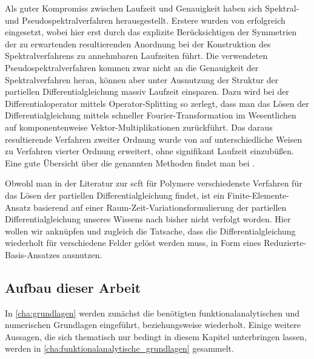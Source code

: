 Als guter Kompromiss zwischen Laufzeit und Genauigkeit haben sich Spektral- und Pseudospektralverfahren herausgestellt.
Erstere wurden von \textcite{Matsen:1994bz} erfolgreich eingesetzt, wobei hier erst durch das explizite Berücksichtigen der Symmetrien der zu erwartenden resultierenden Anordnung bei der Konstruktion des Spektralverfahrens zu annehmbaren Laufzeiten führt.
Die verwendeten Pseudospektralverfahren kommen zwar nicht an die Genauigkeit der Spektralverfahren heran, können aber unter Ausnutzung der Struktur der partiellen Differentialgleichung massiv Laufzeit einsparen.
Dazu wird bei \textcite{Rasmussen:2002kt} der Differentialoperator mittels Operator-Splitting so zerlegt, dass man das Lösen der Differentialgleichung mittels schneller Fourier-Transformation im Wesentlichen auf komponentenweise Vektor-Multiplikationen zurückführt.
Das daraus resultierende Verfahren zweiter Ordnung wurde von \textcite{GarciaCervera:2006uu,Ranjan:2007kl} auf unterschiedliche Weisen zu Verfahren vierter Ordnung erweitert, ohne signifikant Laufzeit einzubüßen.
Eine gute Übersicht über die genannten Methoden findet man bei \textcite[Section 3.6]{Fredrickson:2006th}.

Obwohl man in der Literatur zur \ac{scft} für Polymere verschiedenste Verfahren für das Lösen der partiellen Differentialgleichung findet, ist ein Finite-Elemente-Ansatz basierend auf einer Raum-Zeit-Variationsformulierung der partiellen Differentialgleichung unseres Wissens nach bisher nicht verfolgt worden.
Hier wollen wir anknüpfen und zugleich die Tatsache, dass die Differentialgleichung wiederholt für verschiedene Felder gelöst werden muss, in Form eines Reduzierte-Basis-Ansatzes ausnutzen.


\subsection*{Aufbau dieser Arbeit}


In \autoref{cha:grundlagen} werden zunächst die benötigten funktionalanalytischen und numerischen Grundlagen eingeführt, beziehungsweise wiederholt.
Einige weitere Aussagen, die sich thematisch nur bedingt in diesem Kapitel unterbringen lassen, werden in \autoref{cha:funktionalanalytische_grundlagen} gesammelt.

